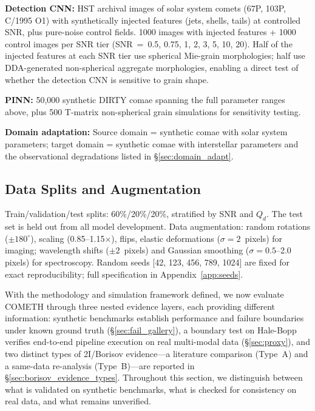\documentclass[usenatbib]{mnras}
\begin{document}
\textbf{Detection CNN:} HST archival images of solar system comets (67P, 103P, C/1995 O1) with synthetically injected features (jets, shells, tails) at controlled SNR, plus pure-noise control fields. 1000 images with injected features + 1000 control images per SNR tier (SNR~=~0.5, 0.75, 1, 2, 3, 5, 10, 20). Half of the injected features at each SNR tier use spherical Mie-grain morphologies; half use DDA-generated non-spherical aggregate morphologies, enabling a direct test of whether the detection CNN is sensitive to grain shape.

\textbf{PINN:} 50,000 synthetic DIRTY comae spanning the full parameter ranges above, plus 500 T-matrix non-spherical grain simulations for sensitivity testing.

\textbf{Domain adaptation:} Source domain = synthetic comae with solar system parameters; target domain = synthetic comae with interstellar parameters and the observational degradations listed in \S\ref{sec:domain_adapt}.

\subsection{Data Splits and Augmentation}

Train/validation/test splits: 60\%/20\%/20\%, stratified by SNR and $Q_d$. The test set is held out from all model development. Data augmentation: random rotations ($\pm 180^\circ$), scaling (0.85--1.15$\times$), flips, elastic deformations ($\sigma = 2$~pixels) for imaging; wavelength shifts ($\pm 2$~pixels) and Gaussian smoothing ($\sigma = 0.5$--2.0 pixels) for spectroscopy. Random seeds [42, 123, 456, 789, 1024] are fixed for exact reproducibility; full specification in Appendix~\ref{app:seeds}.

With the methodology and simulation framework defined, we now evaluate COMETH through three nested evidence layers, each providing different information: synthetic benchmarks establish performance and failure boundaries under known ground truth (\S\ref{sec:fail_gallery}), a boundary test on Hale-Bopp verifies end-to-end pipeline execution on real multi-modal data (\S\ref{sec:proxy}), and two distinct types of 2I/Borisov evidence---a literature comparison (Type~A) and a same-data re-analysis (Type~B)---are reported in \S\ref{sec:borisov_evidence_types}. Throughout this section, we distinguish between what is validated on synthetic benchmarks, what is checked for consistency on real data, and what remains unverified.
\end{document}
